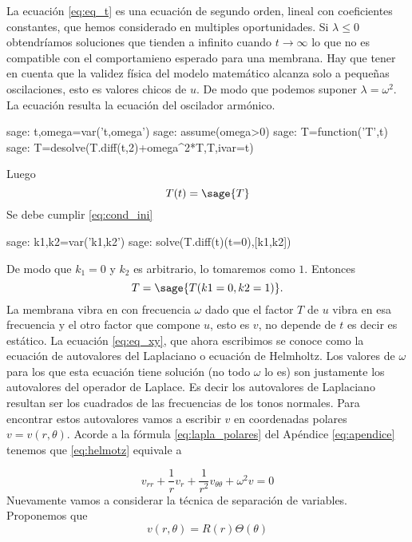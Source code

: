 \documentclass{article}
\newcounter{cor_cont}
\renewcommand{\emph}[1]{\textcolor[rgb]{0,0,1}{#1}}
\begin{document}
La ecuación \eqref{eq:eq_t} es una ecuación de segundo orden, lineal con coeficientes constantes, que hemos considerado en multiples oportunidades. Si $\lambda\leq 0$ obtendríamos soluciones que tienden a infinito cuando $t\to\infty$ lo que no es compatible con el comportamieno esperado para una membrana. Hay que tener en cuenta que la validez física del modelo matemático alcanza solo a pequeñas oscilaciones, esto es valores chicos de $u$. De modo que podemos suponer $\lambda=\omega^2$. La ecuación resulta la ecuación del oscilador armónico. 
\begin{sagecommandline}
sage: t,omega=var('t,omega')
sage: assume(omega>0)
sage: T=function('T',t)
sage: T=desolve(T.diff(t,2)+omega^2*T,T,ivar=t)
 
\end{sagecommandline}
Luego
\[T(t)=\sage{T}\]
Se debe cumplir \eqref{eq:cond_ini}
\begin{sagecommandline}
sage: k1,k2=var('k1,k2')
sage: solve(T.diff(t)(t=0),[k1,k2])
\end{sagecommandline}
De modo que $k_1=0$ y $k_2$ es arbitrario, lo tomaremos como $1$. Entonces 
\[T=\sage{T(k1=0,k2=1)}.\]
\emph{La membrana vibra en con frecuencia $\omega$} dado que el factor  $T$ de $u$ vibra en esa frecuencia y el otro factor que compone $u$, esto es $v$, no depende de $t$ es decir es estático. 
La ecuación \eqref{eq:eq_xy}, que ahora escribimos
se conoce como la ecuación de autovalores del Laplaciano o ecuación de Helmholtz.  Los valores de $\omega$ para los que esta ecuación tiene solución (no todo $\omega$ lo es)  son justamente los autovalores del operador de Laplace. Es decir los autovalores de Laplaciano resultan ser los cuadrados de las frecuencias de los tonos normales. Para encontrar estos autovalores vamos a escribir $v$ en coordenadas polares $v=v(r,\theta)$. Acorde a la fórmula \eqref{eq:lapla_polares} del Apéndice  \ref{eq:apendice} tenemos que \eqref{eq:helmotz} equivale a

\begin{equation}\label{eq:ecu_aux_1}v_{rr}+\frac{1}{r}v_r+\frac{1}{r^2}v_{\theta\theta}+\omega^2v=0
\end{equation}
Nuevamente vamos a considerar la técnica de separación de variables. Proponemos que
\[v(r,\theta)=R(r)\Theta(\theta)\]
\end{document}
